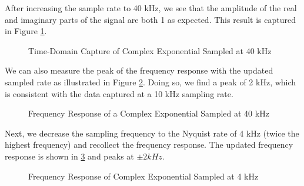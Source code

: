 \documentclass{article}
\begin{document}
After increasing the sample rate to 40 kHz, we see that the amplitude of the real and imaginary parts of the signal are both 1 as expected. This result is captured in Figure \ref{fig::complex_sampling_time_domain_40k_samp_rate}.

\begin{figure}[H]
	\centerline{}
	\caption{Time-Domain Capture of Complex Exponential Sampled at 40 kHz}
	\label{fig::complex_sampling_time_domain_40k_samp_rate}
\end{figure}

We can also measure the peak of the frequency response with the updated sampled rate as illustrated in Figure \ref{fig::complex_sampling_freq_domain_40k_samp_rate}. Doing so, we find a peak of 2 kHz, which is consistent with the data captured at a 10 kHz sampling rate.

\begin{figure}[H]
	\centerline{}
	\caption{Frequency Response of a Complex Exponential Sampled at 40 kHz}
	\label{fig::complex_sampling_freq_domain_40k_samp_rate}
\end{figure}

Next, we decrease the sampling frequency to the Nyquist rate of 4 kHz (twice the highest frequency) and recollect the frequency response. The updated frequency response is shown in \ref{fig::complex_sampling_freq_domain_4k_samp_rate} and peaks at $\pm 2 kHz$.

\begin{figure}[H]
	\centerline{}
	\caption{Frequency Response of Complex Exponential Sampled at 4 kHz}
	\label{fig::complex_sampling_freq_domain_4k_samp_rate}
\end{figure}
\end{document}
